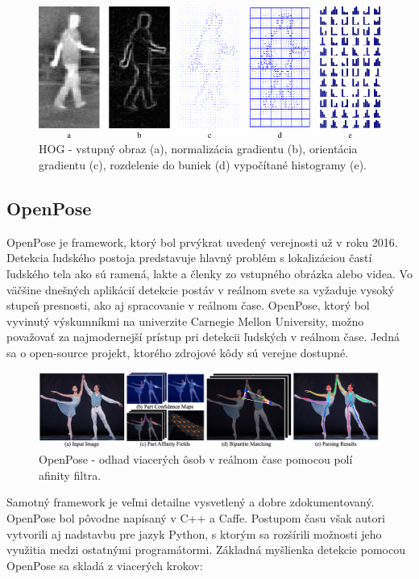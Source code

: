 \documentclass[slovak,master,dept460,male,cpp,cpdeclaration]{diploma}
\begin{document}
\begin{figure}[H]
	\centering
	\includegraphics[width=1\textwidth]{Figures/hog3.png}
	\caption{HOG - vstupný obraz (a), normalizácia gradientu (b), orientácia gradientu (c), rozdelenie do buniek (d) vypočítané histogramy (e). \cite{bertozzi2007pedestrian}}
	\label{fig:HOG2}
\end{figure}


\newpage
\subsection{OpenPose}
OpenPose\cite{cao2018openpose} je framework, ktorý bol prvýkrat uvedený verejnosti už v roku 2016. Detekcia ľudského postoja predstavuje hlavný problém s lokalizáciou častí ľudského tela ako sú ramená, lakte a členky zo vstupného obrázka alebo videa. Vo väčšine dnešných aplikácií detekcie postáv v reálnom svete sa vyžaduje vysoký stupeň presnosti, ako aj spracovanie v reálnom čase.
OpenPose, ktorý bol vyvinutý výskumníkmi na univerzite Carnegie Mellon University, možno považovať za najmodernejší prístup pri detekcii ľudských v reálnom čase. Jedná sa o open-source projekt, ktorého zdrojové kôdy sú verejne dostupné\cite{githubOpenpose}.

\begin{figure}[H]
	\centering
	\includegraphics[width=1\textwidth]{Figures/openposePipeline.png}
	\caption{OpenPose - odhad viacerých ôsob v reálnom čase pomocou polí afinity filtra.\cite{cao2018openpose}}
	\label{fig:openposeOverall}
\end{figure}

 Samotný framework je veľmi detailne vysvetlený a dobre zdokumentovaný. OpenPose bol pôvodne napísaný v C++ a Caffe\cite{jia2014caffe}. Postupom času však  autori vytvorili aj  nadstavbu pre jazyk Python, s ktorým sa rozšírili možnosti jeho využitia medzi ostatnými programátormi. Základná myšlienka detekcie pomocou OpenPose sa skladá z viacerých krokov:
\end{document}
